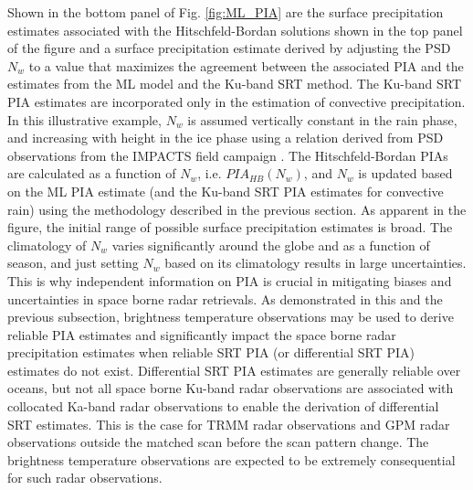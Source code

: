 \documentclass[10pt]{ietbook}
\begin{document}
Shown in the bottom panel of Fig. \ref{fig:ML_PIA} are the surface precipitation estimates associated with the Hitschfeld-Bordan 
solutions shown
in the top panel of the figure and a surface precipitation estimate derived by adjusting the PSD $N_w$ to a value that maximizes the
agreement between the associated PIA and the estimates from the ML model and the Ku-band SRT method. The Ku-band SRT PIA estimates are incorporated
only in the estimation of convective precipitation.  In this illustrative example, $N_w$ is assumed vertically constant in the rain phase,
and increasing with height in the ice phase using a relation derived from PSD observations from the IMPACTS field campaign \cite{impacts2022}.  
The Hitschfeld-Bordan PIAs are calculated as a function of $N_w$, i.e. $PIA_{HB}(N_w)$, and
$N_w$ is updated based on the ML PIA estimate (and the Ku-band SRT PIA estimates for convective rain) using the methodology described in the
previous section.  As apparent in the figure, the initial range of possible surface precipitation estimates is broad.  The 
climatology of $N_w$
varies significantly around the globe and as a function of season, and just setting $N_w$ based on its climatology results in large uncertainties.
This is why independent information on PIA is crucial in mitigating biases and uncertainties in space borne radar retrievals. 
As demonstrated in this and the previous subsection, brightness temperature observations may be used to derive reliable PIA estimates and significantly
impact the space borne radar precipitation estimates when reliable SRT PIA (or differential SRT PIA) estimates do not exist.  Differential SRT PIA estimates
are generally reliable over oceans, but not all space borne Ku-band radar observations are associated with collocated Ka-band 
radar observations to enable the derivation of differential SRT estimates.
This is the case for TRMM radar observations and GPM radar observations outside the matched scan before the scan pattern change. The brightness temperature
observations are expected to be extremely consequential for such radar observations.
\end{document}
